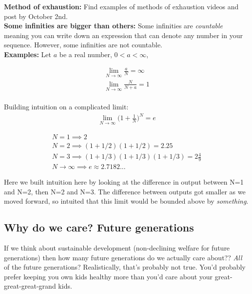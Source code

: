 \documentclass{article}
\begin{document}

\textbf{Method of exhaustion:} Find examples of methods of exhaustion videos and post by October 2nd. \\

\textbf{Some infinities are bigger than others:} Some infinities are \textit{countable} meaning you can write down an expression that can denote any number in your sequence. However, some infinities are not countable. \\

\textbf{Examples:}
Let $a$ be a real number, $0<a<\infty$,

\begin{align*}
    \lim_{N\to\infty} \frac{a}{N} = \infty\\
    \lim_{N\to\infty} \frac{N}{N+a} = 1\\
\end{align*}

Building intuition on a complicated limit: 
\begin{align*}
    \lim_{N \to \infty} \Bigg(1+ \frac{1}{N}\Bigg)^N  = e
\end{align*}

\begin{align*}
    N = 1 \implies 2 \\
    N = 2 \implies (1+1/2)(1+1/2) = 2.25\\
    N = 3 \implies (1+1/3)(1+1/3)(1+1/3) = 2\frac{4}{9}\\
    N \rightarrow \infty \implies e \approx 2.7182...
\end{align*}

Here we built intuition here by looking at the difference in output between N=1 and N=2, then N=2 and N=3. The difference between outputs got smaller as we moved forward, so intuited that this limit would be bounded above by \textit{something}. 

\subsection{Why do we care? Future generations}
If we think about sustainable development (non-declining welfare for future generations) then how many future generations do we actually care about?? \textit{All} of the future generations? Realistically, that's probably not true. You'd probably prefer keeping you own kids healthy more than you'd care about your great-great-great-grand kids. \\
\end{document}
